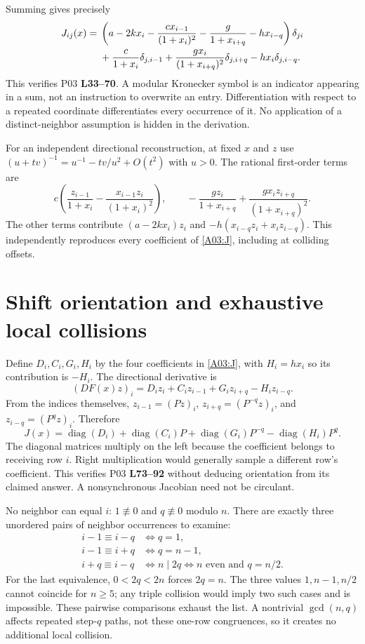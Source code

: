 \documentclass[11pt]{article}
\newcommand{\diag}{\operatorname{diag}}
\newcommand{\lin}[1]{\textbf{L#1}}
\begin{document}
Summing gives precisely
\begin{align}
 J_{ij}(x)={}&\left(a-2kx_i-\frac{c x_{i-1}}{(1+x_i)^2}
                  -\frac{g}{1+x_{i+q}}-h x_{i-q}\right)\delta_{ji}\notag\\
 &+\frac{c}{1+x_i}\delta_{j,i-1}
  +\frac{g x_i}{(1+x_{i+q})^2}\delta_{j,i+q}
  -h x_i\delta_{j,i-q}.\label{A03:J}
\end{align}
This verifies P03 \lin{33--70}. A modular Kronecker symbol is an indicator
appearing in a sum, not an instruction to overwrite an entry. Differentiation
with respect to a repeated coordinate differentiates every occurrence of it.
No application of a distinct-neighbor assumption is hidden in the derivation.

For an independent directional reconstruction, at fixed $x$ and $z$ use
$(u+t v)^{-1}=u^{-1}-t v/u^2+O(t^2)$ with $u>0$.
The rational first-order terms are
\[
 c\left(\frac{z_{i-1}}{1+x_i}
        -\frac{x_{i-1}z_i}{(1+x_i)^2}\right),\qquad
 -\frac{g z_i}{1+x_{i+q}}+\frac{g x_i z_{i+q}}{(1+x_{i+q})^2}.
\]
The other terms contribute $(a-2kx_i)z_i$ and
$-h(x_{i-q}z_i+x_i z_{i-q})$. This independently reproduces every coefficient
of \eqref{A03:J}, including at colliding offsets.

\section{Shift orientation and exhaustive local collisions}
Define $D_i,C_i,G_i,H_i$ by the four coefficients in \eqref{A03:J}, with
$H_i=h x_i$ so its contribution is $-H_i$. The directional derivative is
\[
 (DF(x)z)_i=D_i z_i+C_i z_{i-1}+G_i z_{i+q}-H_i z_{i-q}.
\]
From the indices themselves, $z_{i-1}=(Pz)_i$,
$z_{i+q}=(P^{-q}z)_i$, and $z_{i-q}=(P^qz)_i$. Therefore
\begin{equation}
 J(x)=\diag(D_i)+\diag(C_i)P+\diag(G_i)P^{-q}
                         -\diag(H_i)P^q.\label{A03:shift}
\end{equation}
The diagonal matrices multiply on the left because the coefficient belongs
to receiving row $i$. Right multiplication would generally sample a different
row's coefficient. This verifies P03 \lin{73--92} without deducing orientation
from its claimed answer. A nonsynchronous Jacobian need not be circulant.

No neighbor can equal $i$: $1\not\equiv0$ and $q\not\equiv0$ modulo $n$.
There are exactly three unordered pairs of neighbor occurrences to examine:
\begin{align*}
 i-1\equiv i-q&\iff q=1,\\
 i-1\equiv i+q&\iff q=n-1,\\
 i+q\equiv i-q&\iff n\mid 2q
                    \iff n\text{ even and }q=n/2.
\end{align*}
For the last equivalence, $0<2q<2n$ forces $2q=n$. The three values
$1,n-1,n/2$ cannot coincide for $n\ge5$; any triple collision would imply
two such cases and is impossible. These pairwise comparisons exhaust the
list. A nontrivial $\gcd(n,q)$ affects repeated step-$q$ paths, not these
one-row congruences, so it creates no additional local collision.
\end{document}
